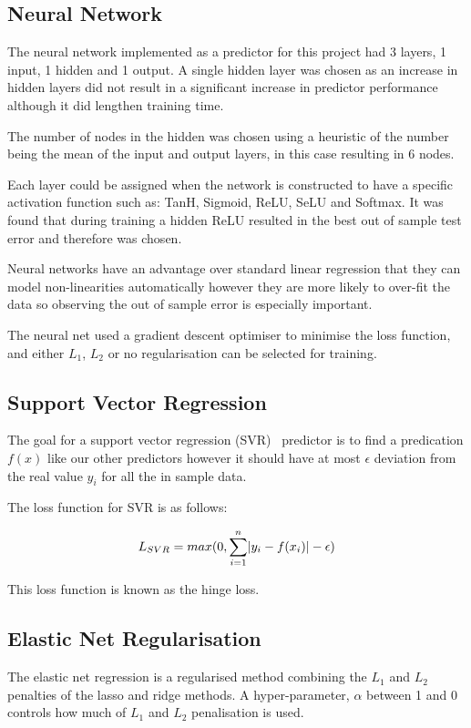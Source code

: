 \documentclass[10pt,twocolumn,letterpaper]{article}
\DeclarePairedDelimiter\abs{\lvert}{\rvert}%
\begin{document}
\subsection{Neural Network}
The neural network implemented as a predictor for this project had 3 layers, 1 input, 1 hidden and 1 output. A single hidden layer was chosen as an increase in hidden layers did not result in a significant increase in predictor performance although it did lengthen training time.

The number of nodes in the hidden was chosen using a heuristic of the number being the mean of the input and output layers, in this case resulting in 6 nodes.

Each layer could be assigned when the network is constructed to have a specific activation function such as: TanH, Sigmoid, ReLU, SeLU and Softmax. It was found that during training a hidden ReLU resulted in the best out of sample test error and therefore was chosen. 

Neural networks have an advantage over standard linear regression that they can model non-linearities automatically however they are more likely to over-fit the data so observing the out of sample error is especially important.

The neural net used a gradient descent optimiser to minimise the loss function, and either $L_1$, $L_2$ or no regularisation can be selected for training. 

\subsection{Support Vector Regression}
The goal for a support vector regression (SVR)~\cite{Cortes1995} predictor is to find a predication $f(x)$ like our other predictors however it should have at most $\epsilon$ deviation from the real value $y_i$ for all the in sample data.

The loss function for SVR is as follows:

\begin{equation}
L_{SVR} = max(0, \sum_{i = 1}^{n} \abs{y_i - f(x_i)} - \epsilon)
\end{equation}

This loss function is known as the hinge loss.

\subsection{Elastic Net Regularisation}
The elastic net regression is a regularised method combining the $L_1$ and $L_2$ penalties of the lasso and ridge methods. A hyper-parameter, $\alpha$ between 1 and 0 controls how much of $L_1$ and $L_2$ penalisation is used.
\end{document}
